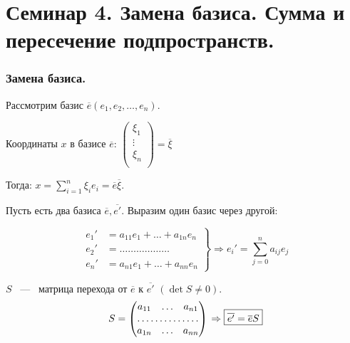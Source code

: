 \part{Семинар 4. Замена базиса. Сумма и пересечение подпространств.}
\section{Замена базиса.}
Рассмотрим базис $\overline{e}(e_1,e_2,\dots,e_n)$.

Координаты $x$ в базисе $\overline{e}$: $ \begin{pmatrix}
\xi_1\\  
\vdots\\
\xi_n\\
\end{pmatrix} = \overline{\xi}$

\vspace{0.25cm}
Тогда: $x  = \sum\limits_{i=1}^n \xi_ie_i = \overline{e}\overline{\xi}$.
\vspace{5mm}

Пусть есть два базиса $\overline{e}, \overline{e'}$. Выразим один базис через другой:

\begin{equation*}
\left.
\begin{aligned}
e_1' &= a_{11}e_1 + \dots+ a_{1n}e_n\\
e_2' &= \dots\dots\dots\dots\dots\dots\\
e_n' &= a_{n1}e_1 + \dots  + a_{nn}e_n
\end{aligned} 
\right\} \Rightarrow e_i' = \sum\limits_{j=0}^n a_{ij}e_j \end{equation*}


\vspace{3mm}

$S$ ~---~ \textsf{матрица перехода} от $\overline{e}$ к $\overline{e'}$ $(\det S\neq 0).$
\begin{equation*}
\left.
\begin{aligned}S = \begin{pmatrix}
a_{11} & \dots & a_{n1}\\
\hdotsfor{3}\\
a_{1n} & \dots & a_{nn}\\
\end{pmatrix}
\end{aligned} 
\right. \Rightarrow \boxed{\overline{e'} = \overline{e}S}
\end{equation*}
\vspace{3mm}


